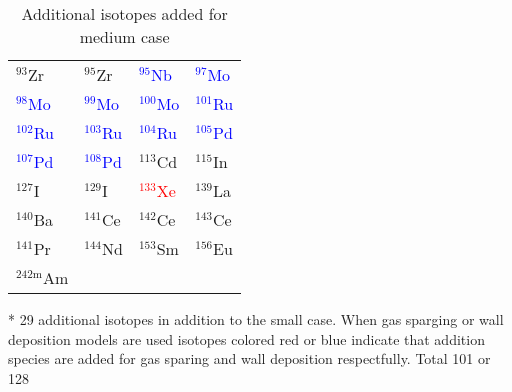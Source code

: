 \begin{table}[htbp]
    \caption{\label{tab:medium_nuclides} Additional isotopes added for medium case}
    \centering
    \begin{threeparttable}
    \begin{tabular}{C{3cm}C{3cm}C{3cm}C{3cm}}
    \hline
    ${}^{93}$Zr & ${}^{95}$Zr & \textcolor{blue}{${}^{95}$Nb} & \textcolor{blue}{${}^{97}$Mo} \\
    \textcolor{blue}{${}^{98}$Mo} & \textcolor{blue}{${}^{99}$Mo} & \textcolor{blue}{${}^{100}$Mo} & \textcolor{blue}{${}^{101}$Ru} \\
    \textcolor{blue}{${}^{102}$Ru} & \textcolor{blue}{${}^{103}$Ru} & \textcolor{blue}{${}^{104}$Ru} & \textcolor{blue}{${}^{105}$Pd} \\
    \textcolor{blue}{${}^{107}$Pd} & \textcolor{blue}{${}^{108}$Pd} & ${}^{113}$Cd & ${}^{115}$In \\
    ${}^{127}$I & ${}^{129}$I & \textcolor{red}{${}^{133}$Xe} & ${}^{139}$La \\
    ${}^{140}$Ba & ${}^{141}$Ce & ${}^{142}$Ce & ${}^{143}$Ce \\
    ${}^{141}$Pr & ${}^{144}$Nd & ${}^{153}$Sm & ${}^{156}$Eu \\
    ${}^{242\text{m}}$Am & ${}^{}$ & ${}^{}$ & ${}^{}$ \\
    \hline
    \end{tabular}
    \begin{tablenotes}\footnotesize
    \item[*] 29 additional isotopes in addition to the small case. When gas sparging or wall deposition models are used isotopes colored red or blue indicate that addition species are added for gas sparing and wall deposition respectfully. Total 101 or 128
    
   \end{tablenotes}
   \end{threeparttable}
\end{table}
